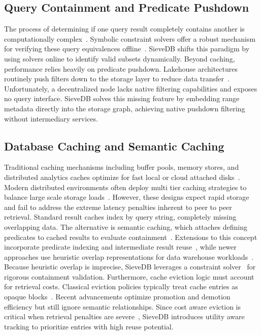 \subsection{Query Containment and Predicate Pushdown}
\label{sec:containment}
The process of determining if one query result completely contains another is computationally complex~\cite{chandra1977optimal}. Symbolic constraint solvers offer a robust mechanism for verifying these query equivalences offline~\cite{he2024verieql, chu2017cosette}. SieveDB shifts this paradigm by using solvers online to identify valid subsets dynamically. Beyond caching, performance relies heavily on predicate pushdown. Lakehouse architectures routinely push filters down to the storage layer to reduce data transfer~\cite{armbrust2021lakehouse, yang2021flexpushdowndb}. Unfortunately, a decentralized node lacks native filtering capabilities and exposes no query interface. SieveDB solves this missing feature by embedding range metadata directly into the storage graph, achieving native pushdown filtering without intermediary services.

\subsection{Database Caching and Semantic Caching}
\label{sec:caching}
Traditional caching mechanisms including buffer pools, memory stores, and distributed analytics caches optimize for fast local or cloud attached disks~\cite{graefe2011modern, fitzpatrick2004distributed, redis2009, dageville2016snowflake, melnik2010dremel}. Modern distributed environments often deploy multi tier caching strategies to balance large scale storage loads~\cite{liu2019distcache, durner2021crystal, tang2024data, zhao2013hycache, wang2022metadata}. However, these designs expect rapid storage and fail to address the extreme latency penalties inherent to peer to peer retrieval. Standard result caches index by query string, completely missing overlapping data. The alternative is semantic caching, which attaches defining predicates to cached results to evaluate containment~\cite{dar1996semantic}. Extensions to this concept incorporate predicate indexing and intermediate result reuse~\cite{keller1996predicate, roy2000don}, while newer approaches use heuristic overlap representations for data warehouse workloads~\cite{you2025soc}. Because heuristic overlap is imprecise, SieveDB leverages a constraint solver~\cite{de2008z3} for rigorous containment validation. Furthermore, cache eviction logic must account for retrieval costs. Classical eviction policies typically treat cache entries as opaque blocks~\cite{megiddo2003arc, einziger2017tinylfu, jiang2002lirs, zhang2024sieve}. Recent advancements optimize promotion and demotion efficiency but still ignore semantic relationships. Since cost aware eviction is critical when retrieval penalties are severe~\cite{podlipnig2003survey}, SieveDB introduces utility aware tracking to prioritize entries with high reuse potential.


